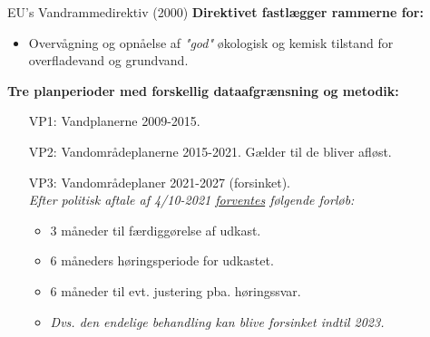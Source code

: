 \begin{frame}{EU’s Vandrammedirektiv (2000)}
  \textbf{Direktivet fastlægger rammerne for:}
  \begin{itemize}
    \item Overvågning og opnåelse af \textit{"god"} økologisk og kemisk tilstand for overfladevand og grundvand.
  \end{itemize}
  \textbf{Tre planperioder med forskellig dataafgrænsning og metodik:}
  \begin{enumerate}
    \item[VP1:] Vandplanerne 2009-2015.
    \item[VP2:] Vandområdeplanerne 2015-2021. Gælder til de bliver afløst.
    \item[VP3:] Vandområdeplaner 2021-2027 (forsinket).\\
    \textit{Efter politisk aftale af 4/10-2021 \href{https://www.ft.dk/samling/20201/almdel/MOF/bilag/366/2340807/index.htm}{forventes} følgende forløb:}
    \begin{itemize}
      \item 3 måneder til færdiggørelse af udkast.
      \item 6 måneders høringsperiode for udkastet.
      \item 6 måneder til evt. justering pba. høringssvar.
      \item \textit{Dvs. den endelige behandling kan blive forsinket indtil 2023.}
    \end{itemize}
  \end{enumerate}
\end{frame}
